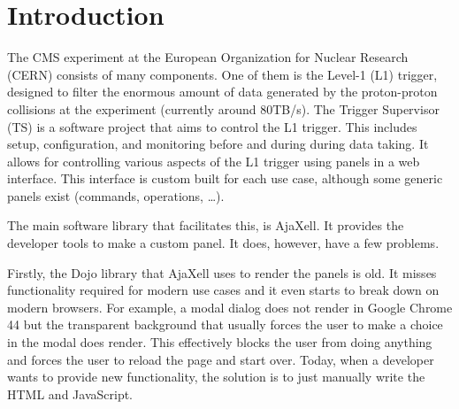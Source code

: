 \documentclass[journal,compsoc,a4paper]{IEEEtran}
\begin{document}
\maketitle

\IEEEdisplaynotcompsoctitleabstractindextext

\IEEEpeerreviewmaketitle

\section{Introduction}

%
The CMS experiment at the European Organization for Nuclear Research (CERN)
consists of many components. One of them is the Level-1 (L1) trigger, designed to filter
the enormous amount of data generated by the proton-proton collisions at the
experiment (currently around 80TB/s\cite{CMS_Experiment2}).
The Trigger Supervisor (TS) is a software project that aims to control the L1 trigger.
This includes setup, configuration, and monitoring before and during during data
taking. It allows for controlling various aspects of the L1 trigger using panels
in a web interface. This interface is custom built for each use case, although
some generic panels exist (commands, operations, \ldots).

The main software library that facilitates this, is AjaXell. It provides the
developer tools to make a custom panel. It does, however, have a few problems.

Firstly, the Dojo library that AjaXell uses to render the panels is old. It
misses functionality required for modern use cases and it even starts to break
down on modern browsers. For example, a modal dialog does not render in Google
Chrome 44 but the transparent background that usually forces the user to make
a choice in the modal does render. This effectively blocks the user from doing
anything and forces the user to reload the page and start over.
Today, when a developer wants to provide new functionality, the solution is to
just manually write the HTML and JavaScript.
\end{document}

